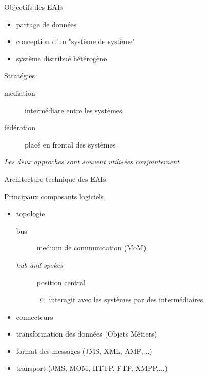 \begin{frame}
  \begin{block}{Objectifs des EAIs}
    \begin{itemize}
      \item partage de données
      \item conception d'un "système de système"
      \item système distribué hétérogène
    \end{itemize}
  \end{block}

  \begin{block}{Stratégies}
    \begin{description}
      \item[mediation] intermédiare entre les systèmes
      \item[fédération] placé en frontal des systèmes
    \end{description}
    \begin{center}
      \textit{Les deux approches sont souvent utilisées conjointement}
    \end{center}
  \end{block}
\end{frame}

\begin{frame}{Architecture technique des EAIs}
  \begin{block}{Principaux composants logiciels}
    \begin{itemize}
      \item topologie
      \begin{description}
        \item[bus] medium de communication (MoM)
        \item[\textit{hub and spokes}] position central
        \begin{itemize}
         \item interagit avec les systèmes par des intermédiaires
        \end{itemize}
      \end{description}
      \item connecteurs
      \item transformation des données (Objets Métiers)
      \item format des messages (JMS, XML, AMF,...)
      \item transport (JMS, MOM, HTTP, FTP, XMPP,...)
    \end{itemize}
  \end{block}
\end{frame}

